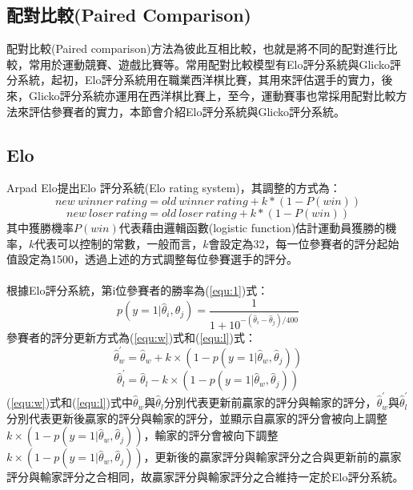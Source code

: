 \documentclass[12pt]{article}
\begin{document}
\subsection*{配對比較(Paired Comparison)}
配對比較(Paired comparison)方法為彼此互相比較，也就是將不同的配對進行比較，常用於運動競賽、遊戲比賽等。常用配對比較模型有Elo評分系統與Glicko評分系統，起初，Elo評分系統用在職業西洋棋比賽，其用來評估選手的實力，後來，Glicko評分系統亦運用在西洋棋比賽上，至今，運動賽事也常採用配對比較方法來評估參賽者的實力，本節會介紹Elo評分系統與Glicko評分系統。
\subsection{Elo}
Arpad Elo提出Elo \cite{elo1978rating} 評分系統(Elo rating system)，其調整的方式為：
\[
new\  winner\  rating = old\   winner\  rating + k * (1-P(win))
\]
\[
new\  loser\  rating = old\   loser\  rating + k * (1-P(win))
\]
其中獲勝機率$P(win)$代表藉由邏輯函數(logistic function)估計運動員獲勝的機率，$k$代表可以控制的常數，一般而言，$k$會設定為32，每一位參賽者的評分起始值設定為1500，透過上述的方式調整每位參賽選手的評分。
\\
\\
根據Elo評分系統，第i位參賽者的勝率為(\ref{equ:1})式：
\begin{equation}
p(y = 1 | \hat{\theta}_i,\hat{\theta}_j) = \frac{1}{1+10^{-(\hat{\theta}_i-\hat{\theta}_j)/400}} 
\label{equ:1}
\end{equation}
參賽者的評分更新方式為(\ref{equ:w})式和(\ref{equ:l})式：
\begin{equation}
\hat{\theta}^{'}_w = \hat{\theta}_w + k \times (1 - p(y = 1|\hat{\theta}_w,\hat{\theta}_j))
\label{equ:w}
\end{equation}
\begin{equation}
\hat{\theta}^{'}_l = \hat{\theta}_l - k \times (1 - p(y = 1|\hat{\theta}_w,\hat{\theta}_j))
\label{equ:l}
\end{equation}
(\ref{equ:w})式和(\ref{equ:l})式中$\hat{\theta}_w$與$\hat{\theta}_l$分別代表更新前贏家的評分與輸家的評分，$\hat{\theta}^{'}_w$與$\hat{\theta}^{'}_l$分別代表更新後贏家的評分與輸家的評分，並顯示自贏家的評分會被向上調整$k \times (1-p(y = 1|\hat{\theta}_w,\hat{\theta}_j))$，輸家的評分會被向下調整$k \times (1-p(y = 1|\hat{\theta}_w,\hat{\theta}_j))$，更新後的贏家評分與輸家評分之合與更新前的贏家評分與輸家評分之合相同，故贏家評分與輸家評分之合維持一定於Elo評分系統。
\end{document}
